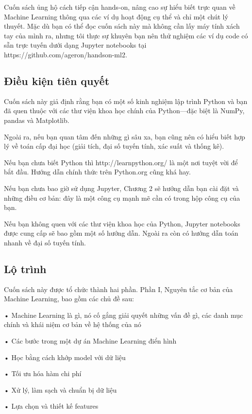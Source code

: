 Cuốn sách ủng hộ cách tiếp cận hands-on, nâng cao sự hiểu biết trực quan về Machine Learning thông qua các ví dụ hoạt động cụ thể và chỉ một chút lý thuyết. Mặc dù bạn có thể đọc cuốn sách này mà không cần lấy máy tính xách tay của mình ra, nhưng tôi thực sự khuyên bạn nên thử nghiệm các ví dụ code có sẵn trực tuyến dưới dạng Jupyter notebooks tại https://github.com/ageron/handson-ml2.

\subsection{Điều kiện tiên quyết}

Cuốn sách này giả định rằng bạn có một số kinh nghiệm lập trình Python và bạn đã quen thuộc với các thư viện khoa học chính của Python—đặc biệt là NumPy, pandas và Matplotlib.

Ngoài ra, nếu bạn quan tâm đến những gì sâu xa, bạn cũng nên có hiểu biết hợp lý về toán cấp đại học (giải tích, đại số tuyến tính, xác suất và thống kê).

Nếu bạn chưa biết Python thì http://learnpython.org/ là một nơi tuyệt vời để bắt đầu. Hướng dẫn chính thức trên Python.org cũng khá hay.

Nếu bạn chưa bao giờ sử dụng Jupyter, Chương 2 sẽ hướng dẫn bạn cài đặt và những điều cơ bản: đây là một công cụ mạnh mẽ cần có trong hộp công cụ của bạn.

Nếu bạn không quen với các thư viện khoa học của Python, Jupyter notebooks được cung cấp sẽ bao gồm một số hướng dẫn. Ngoài ra còn có hướng dẫn toán nhanh về đại số tuyến tính.

\subsection{Lộ trình}

Cuốn sách này được tổ chức thành hai phần. Phần I, Nguyên tắc cơ bản của Machine Learning, bao gồm các chủ đề sau:

• Machine Learning là gì, nó cố gắng giải quyết những vấn đề gì, các danh mục chính và khái niệm cơ bản về hệ thống của nó

• Các bước trong một dự án Machine Learning điển hình

• Học bằng cách khớp model với dữ liệu

• Tối ưu hóa hàm chi phí

• Xử lý, làm sạch và chuẩn bị dữ liệu

• Lựa chọn và thiết kế features


